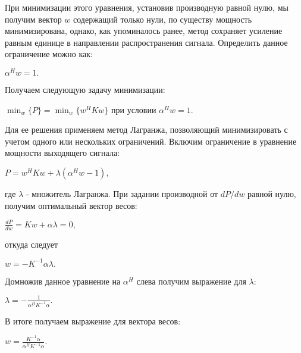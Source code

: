 \documentclass[a4paper,12pt]{report}
\begin{document}
	При минимизации этого уравнения, установив производную равной нулю, мы получим вектор $w$ содержащий только нули, по существу мощность минимизирована, однако, как упоминалось ранее, метод сохраняет усиление равным единице в направлении распространения сигнала. Определить данное ограничение можно как:
	\begin{center}
		$\alpha^Hw = 1.$
	\end{center}
    Получаем следующую задачу минимизации:
    \begin{center}
    	$\min_w \{P\} = \min_w \{w^HKw\}$
    	при условии $\alpha^Hw = 1.$
    \end{center}
	Для ее решения применяем метод Лагранжа, позволяющий минимизировать с учетом одного или нескольких ограничений. Включим ограничение в уравнение мощности выходящего сигнала:
	\begin{center}
		$P = w^HKw + \lambda(\alpha^Hw - 1),$
	\end{center}
	где $\lambda$ - множитель Лагранжа. 
	При задании производной от $dP/dw$ равной нулю, получим оптимальный вектор весов:
	\begin{center}
		$\frac{dP}{dw} = Kw + \alpha \lambda = 0,$
	\end{center}
	откуда следует
	\begin{center}
		$w = -K^{-1} \alpha \lambda.$
	\end{center}
	Домножив данное уравнение на $\alpha^H$ слева получим выражение для $\lambda$:
	\begin{center}
		$\lambda = -\frac{1}{\alpha^HK^{-1} \alpha}.$
	\end{center}
	В итоге получаем выражение для вектора весов:
	\begin{center}
		$w = \frac{K^{-1} \alpha}{\alpha^HK^{-1} \alpha}.$
	\end{center}  
\end{document}
